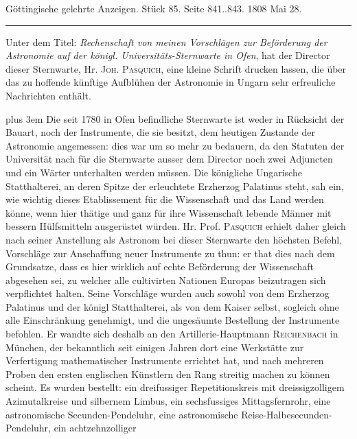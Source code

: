 \clearpage
{}
\hypertarget{native-502-lower}{}\label{native-502-lower}
\begin{center}
\small Göttingische gelehrte Anzeigen. Stück 85. Seite 841..843. 1808 Mai 28.\\[3pt]
\rule{.72\linewidth}{.3pt}
\end{center}

Unter dem Titel: \emph{Rechenschaft von meinen Vorschlägen zur Beförderung der Astronomie auf der königl. Universitäts-Sternwarte in Ofen}, hat der Director dieser Sternwarte, Hr. \textsc{Joh. Pasquich}, eine kleine Schrift drucken lassen, die über das zu hoffende künftige Aufblühen der Astronomie in Ungarn sehr erfreuliche Nachrichten enthält.

{\rightskip=0pt plus 3em Die seit 1780 in Ofen befindliche Sternwarte ist weder in Rücksicht der Bauart, noch der Instrumente, die sie besitzt, dem heutigen Zustande der Astronomie angemessen: dies war um so mehr zu bedauern, da den Statuten der Universität nach für die Sternwarte ausser dem Director noch zwei Adjuncten und ein Wärter unterhalten werden müssen. Die königliche Ungarische Statthalterei, an deren Spitze der erleuchtete Erzherzog Palatinus steht, sah ein, wie wichtig dieses Etablissement für die Wissenschaft und das Land werden könne, wenn hier thätige und ganz für ihre Wissenschaft lebende Männer mit bessern Hülfsmitteln ausgerüstet würden. Hr. Prof. \textsc{Pasquich} erhielt daher gleich nach seiner Anstellung als Astronom bei dieser Sternwarte den höchsten Befehl, Vorschläge zur Anschaffung neuer Instrumente zu thun: er that dies nach dem Grundsatze, dass es hier wirklich auf echte Beförderung der Wissenschaft abgesehen sei, zu welcher alle cultivirten Nationen Europas beizutragen sich verpflichtet halten. Seine Vorschläge wurden auch sowohl von dem Erzherzog Palatinus und der königl Statthalterei, als von dem Kaiser selbst, sogleich ohne alle Einschränkung genehmigt, und die ungesäumte Bestellung der Instrumente befohlen. Er wandte sich deshalb an den Artillerie-Hauptmann \textsc{Reichenbach} in München, der bekanntlich seit einigen Jahren dort eine Werkstätte zur Verfertigung mathematischer Instrumente errichtet hat, und nach mehreren Proben den ersten englischen Künstlern den Rang streitig machen zu können scheint. Es wurden bestellt: ein dreifussiger Repetitionskreis mit dreissigzolligem Azimutalkreise und silbernem Limbus, ein sechsfussiges Mittagsfernrohr, eine astronomische Secunden-Pendeluhr, eine astronomische Reise-Halbesecunden-Pendeluhr, ein achtzehnzolliger 
}

